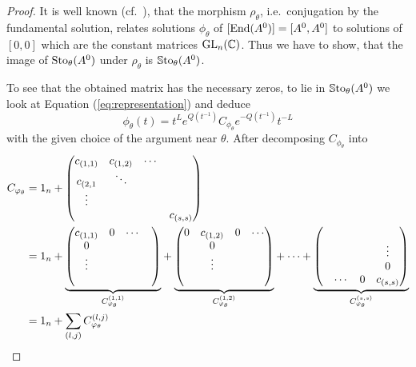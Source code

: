 \begin{proof}
  It is well known (cf.\ \cite[10]{thboalch}), that the morphism
  $\rho_{\theta}$, i.e.\ conjugation by the fundamental solution, relates
  solutions $\phi_\theta$ of $[\operatorname{End}(A^0)]=[A^0,A^0]$ to solutions of $[0,0]$
  which are the constant matrices $\operatorname{GL}_n(\mathbb{C})$.
  Thus we have to show, that the image of $\operatorname{Sto}_\theta(A^0)$ under
  $\rho_{\theta}$ is $\operatorname{\mathbb{S}to}_\theta(A^0)$.

  To see that the obtained matrix has the necessary zeros, to lie in
  $\operatorname{\mathbb{S}to}_{\theta}(A^0)$ we look at Equation (\ref{eq:representation}) and
  deduce
  \begin{equation}\label{eq:repProof1}
    \phi_\theta(t)
    =t^L e^{Q(t^{-1})}C_{\phi_\theta}e^{-Q(t^{-1})}t^{-L}
  \end{equation}
  with the given choice of the argument near $\theta$.
  After decomposing $C_{\phi_\theta}$ into
  \begin{align*}
    C_{\phi_\theta}&=1_n+\begin{pmatrix}
      c_{(1,1)} & c_{(1,2)} & \cdots &\\
      c_{(2,1} & \ddots\\
      \vdots \\
      & & & c_{(s,s)}
    \end{pmatrix}
  \\&=1_n+
    \underset{C_{\phi_\theta}^{(1,1)}}{\underbrace{%
      \begin{pmatrix}
        c_{(1,1)} & 0 & \cdots &\\
        0\\
        \vdots&\\
        &
      \end{pmatrix}
    }}
    +
    \underset{C_{\phi_\theta}^{(1,2)}}{\underbrace{%
      \begin{pmatrix}
        0 & c_{(1,2)} & 0 & \cdots\\
        & 0 &\\
        &\vdots\\
        &
      \end{pmatrix}
    }}
    +\cdots+
    \underset{C_{\phi_\theta}^{(s,s)}}{\underbrace{%
      \begin{pmatrix}
        &\\
        & & & \vdots\\
        & & & 0\\
        & \cdots & 0 & c_{(s,s)}
      \end{pmatrix}
    }}
  \\&=1_n+\sum_{(l,j)}C_{\phi_\theta}^{(l,j)}

\end{align*}
\end{proof}
